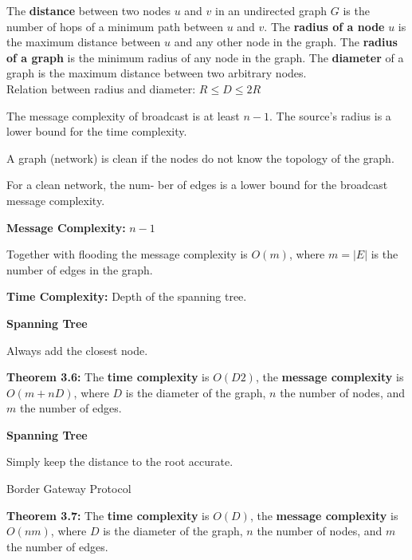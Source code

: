 {
	The {\bf distance} between two nodes $u$ and $v$ in an undirected graph $G$ is
	the number of hops of a minimum path between $u$ and $v$. The {\bf radius of a
	node} $u$ is the maximum distance between $u$ and any other node in the graph.
	The {\bf radius of a graph} is the minimum radius of any node in the graph. The
	{\bf diameter} of a graph is the maximum distance between two arbitrary
	nodes.\\
	Relation between radius and diameter: $R \leq D \leq 2R$ 
}

{
	The message complexity of broadcast is at least $n-1$. The source's radius is
	a lower bound for the time complexity.
}

{
	A graph (network) is clean if the nodes do not know the topology of the graph.
}

{
	For a clean network, the num- ber of edges is a lower bound for the broadcast
	message complexity.
}

{
	\begin{items}
		\item
	\end{items}
}

{
	\begin{items}
		\item {\bf Message Complexity: } $n-1$
		\item Together with flooding the message complexity is $O(m)$, where $m=|E|$
		is the number of edges in the graph.
		\item {\bf Time Complexity: } Depth of the spanning tree.
	\end{items}
}

{
	\begin{items}
		\item {\bf Spanning Tree}
		\item Always add the closest node.
		\item {\bf Theorem 3.6:} The {\bf time complexity} is $O(D2)$, the
		{\bf message complexity} is $O(m + nD)$, where $D$ is the diameter of the
		graph, $n$ the number of nodes, and $m$ the number of edges.
	\end{items}
}

{
	\begin{items}
		\item {\bf Spanning Tree}
		\item Simply keep the distance to the root accurate.
		\item Border Gateway Protocol
		\item {\bf Theorem 3.7:} The {\bf time complexity} is $O(D)$, the
		{\bf message complexity} is $O(nm)$, where $D$ is the diameter of the
		graph, $n$ the number of nodes, and $m$ the number of edges.
	\end{items}
}

